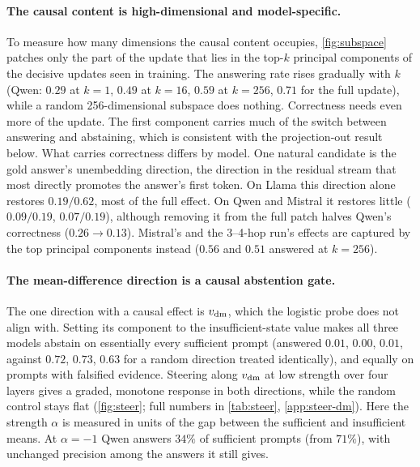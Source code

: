 \paragraph{The causal content is high-dimensional and model-specific.}
To measure how many dimensions the causal content occupies, \cref{fig:subspace} patches only the part of the update that lies in the top-$k$ principal components of the decisive updates seen in training. The answering rate rises gradually with $k$ (Qwen: $0.29$ at $k{=}1$, $0.49$ at $k{=}16$, $0.59$ at $k{=}256$, $0.71$ for the full update), while a random 256-dimensional subspace does nothing. Correctness needs even more of the update. The first component carries much of the switch between answering and abstaining, which is consistent with the projection-out result below. What carries correctness differs by model. One natural candidate is the gold answer's unembedding direction, the direction in the residual stream that most directly promotes the answer's first token. On Llama this direction alone restores $0.19/0.62$, most of the full effect. On Qwen and Mistral it restores little ($0.09/0.19$, $0.07/0.19$), although removing it from the full patch halves Qwen's correctness ($0.26\to0.13$). Mistral's and the 3--4-hop run's effects are captured by the top principal components instead ($0.56$ and $0.51$ answered at $k{=}256$).

\paragraph{The mean-difference direction is a causal abstention gate.}
The one direction with a causal effect is $v_{\mathrm{dm}}$, which the logistic probe does not align with. Setting its component to the insufficient-state value makes all three models abstain on essentially every sufficient prompt (answered $0.01$, $0.00$, $0.01$, against $0.72$, $0.73$, $0.63$ for a random direction treated identically), and equally on prompts with falsified evidence. Steering along $v_{\mathrm{dm}}$ at low strength over four layers gives a graded, monotone response in both directions, while the random control stays flat (\cref{fig:steer}; full numbers in \cref{tab:steer}, \cref{app:steer-dm}). Here the strength $\alpha$ is measured in units of the gap between the sufficient and insufficient means. At $\alpha=-1$ Qwen answers $34\%$ of sufficient prompts (from $71\%$), with unchanged precision among the answers it still gives.

